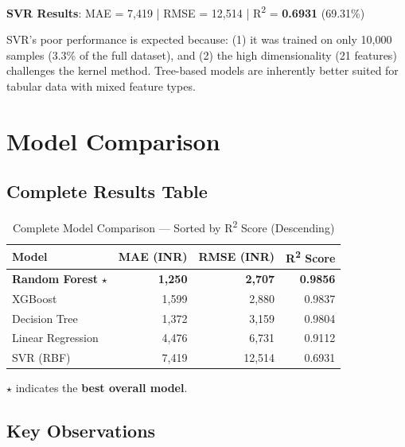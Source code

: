 \documentclass[12pt, a4paper]{article}
\newcommand{\rupee}{\text{₹}}
\begin{document}
\begin{resultbox}
\textbf{SVR Results}: MAE = \rupee7,419 \quad | \quad RMSE = \rupee12,514 \quad | \quad R\textsuperscript{2} = \textbf{0.6931} (69.31\%)
\end{resultbox}

\begin{insightbox}
SVR's poor performance is expected because: (1) it was trained on only 10,000 samples (3.3\% of the full dataset), and (2) the high dimensionality (21 features) challenges the kernel method. Tree-based models are inherently better suited for tabular data with mixed feature types.
\end{insightbox}

\newpage

\section{Model Comparison}

\subsection{Complete Results Table}

\begin{table}[H]
\centering
\caption{Complete Model Comparison — Sorted by R\textsuperscript{2} Score (Descending)}
\begin{tabular}{l r r r}
\toprule
\textbf{Model} & \textbf{MAE (INR)} & \textbf{RMSE (INR)} & \textbf{R\textsuperscript{2} Score} \\
\midrule
\textbf{Random Forest} $\star$ & \textbf{\rupee1,250} & \textbf{\rupee2,707} & \textbf{0.9856} \\
XGBoost              & \rupee1,599 & \rupee2,880 & 0.9837 \\
Decision Tree        & \rupee1,372 & \rupee3,159 & 0.9804 \\
Linear Regression    & \rupee4,476 & \rupee6,731 & 0.9112 \\
SVR (RBF)            & \rupee7,419 & \rupee12,514 & 0.6931 \\
\bottomrule
\end{tabular}
\end{table}

$\star$ indicates the \textbf{best overall model}.

\subsection{Key Observations}
\end{document}

